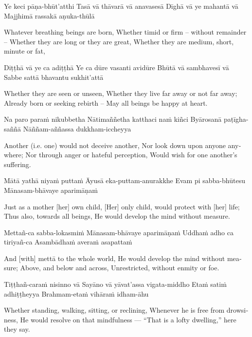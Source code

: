Ye keci pāṇa-bhūt’atthi
Tasā vā thāvarā vā anavasesā
Dīghā vā ye mahantā vā
Majjhimā rassakā aṇuka-thūlā

\begin{english}
  Whatever breathing beings are born,
  Whether timid or firm – without remainder –
  Whether they are long or they are great,
  Whether they are medium, short, minute or fat,
\end{english}

Diṭṭhā vā ye ca adiṭṭhā
Ye ca dūre vasanti avidūre
Bhūtā vā sambhavesī vā
Sabbe sattā bhavantu sukhit’attā

\begin{english}
  Whether they are seen or unseen,
  Whether they live far away or not far away;
  Already born or seeking rebirth –
  May all beings be happy at heart.
\end{english}

Na paro paraṁ nikubbetha
Nātimaññetha katthaci naṁ kiñci
Byārosanā paṭīgha-saññā
Nāññam-aññassa dukkham-iccheyya

\begin{english}
  Another (i.e. one) would not deceive another,
  Nor look down upon anyone anywhere;
  Nor through anger or hateful perception,
  Would wish for one another’s suffering.
\end{english}

Mātā yathā niyaṁ puttaṁ
Āyusā eka-puttam-anurakkhe
Evam pi sabba-bhūtesu
Mānasam-bhāvaye aparimāṇaṁ

\begin{english}
  Just as a mother [her] own child,
  [Her] only child, would protect with [her] life;
  Thus also, towards all beings,
  He would develop the mind without measure.
\end{english}

Mettañ-ca sabba-lokasmiṁ
Mānasam-bhāvaye aparimāṇaṁ
Uddhaṁ adho ca tiriyañ-ca
Asambādhaṁ averaṁ asapattaṁ

\begin{english}
  And [with] mettā to the whole world,
  He would develop the mind without measure;
  Above, and below and across,
  Unrestricted, without enmity or foe.
\end{english}

Tiṭṭhañ-caraṁ nisinno vā
Sayāno vā yāvat’assa vigata-middho
Etaṁ satiṁ adhiṭṭheyya
Brahmam-etaṁ vihāraṁ idham-āhu

\begin{english}
  Whether standing, walking, sitting, or reclining,
  Whenever he is free from drowsiness,
  He would resolve on that mindfulness —
  “That is a lofty dwelling,” here they say.
\end{english}

